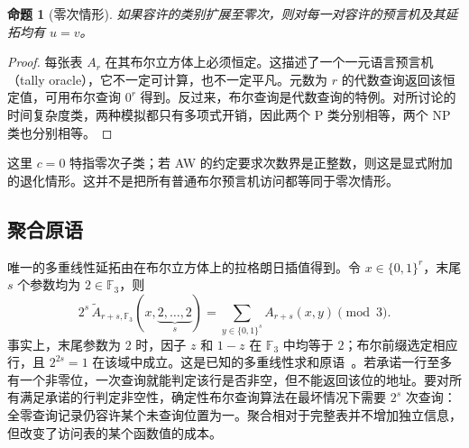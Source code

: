 \documentclass[11pt,a4paper]{article}
\newcommand{\bits}{\{0,1\}}
\newcommand{\Atil}{\widetilde A}
\newcommand{\F}{\mathbb F}
\newtheorem{proposition}[theorem]{命题}
\begin{document}
\begin{proposition}[零次情形]\label{prop:degree0}
如果容许的类别扩展至零次，则对每一对容许的预言机及其延拓均有 $u=v$。
\end{proposition}
\begin{proof}
每张表 $A_r$ 在其布尔立方体上必须恒定。这描述了一个一元语言预言机（tally oracle），它不一定可计算，也不一定平凡。元数为 $r$ 的代数查询返回该恒定值，可用布尔查询 $0^r$ 得到。反过来，布尔查询是代数查询的特例。对所讨论的时间复杂度类，两种模拟都只有多项式开销，因此两个 P 类分别相等，两个 NP 类也分别相等。
\end{proof}
这里 $c=0$ 特指零次子类；若 AW 的约定要求次数界是正整数，则这是显式附加的退化情形。这并不是把所有普通布尔预言机访问都等同于零次情形。

\subsection{聚合原语}
唯一的多重线性延拓由在布尔立方体上的拉格朗日插值得到。令 $x\in\bits^r$，末尾 $s$ 个参数均为 $2\in\F_3$，则
\begin{equation}\label{eq:aggregate}
2^s\,\Atil_{r+s,\F_3}(x,\underbrace{2,\ldots,2}_{s})
=\sum_{y\in\bits^s}A_{r+s}(x,y)\pmod3.
\end{equation}
事实上，末尾参数为 $2$ 时，因子 $z$ 和 $1-z$ 在 $\F_3$ 中均等于 $2$；布尔前缀选定相应行，且 $2^{2s}=1$ 在该域中成立。这是已知的多重线性求和原语~\cite{jkrs,aw}。若承诺一行至多有一个非零位，一次查询就能判定该行是否非空，但不能返回该位的地址。要对所有满足承诺的行判定非空性，确定性布尔查询算法在最坏情况下需要 $2^s$ 次查询：全零查询记录仍容许某个未查询位置为一。聚合相对于完整表并不增加独立信息，但改变了访问表的某个函数值的成本。
\end{document}
